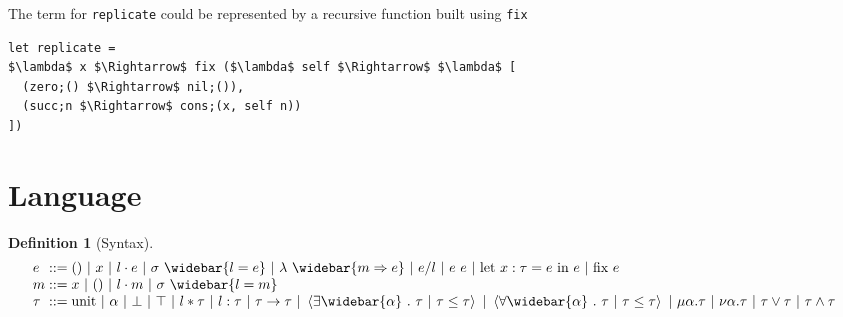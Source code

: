 \documentclass[manuscript]{acmart}
\theoremstyle{definition}
\newtheorem{definition}{Definition}[section]
\begin{document}
\noindent The term for \lstinline{replicate} could be represented by a recursive function built using \lstinline{fix} 

\begin{lstlisting}[]
let replicate = 
$\lambda$ x $\Rightarrow$ fix ($\lambda$ self $\Rightarrow$ $\lambda$ [
  (zero;() $\Rightarrow$ nil;()),
  (succ;n $\Rightarrow$ cons;(x, self n))
]) 
\end{lstlisting}


\section{Language}

\begin{definition}[Syntax]
\[
  \begin{array}{l @{} l}
    e 
    &{} ::=
    \begin{array}[t]{@{} l}
      () 
      \ |\ 
      x
      \ |\ 
      l \cdot e
      \ |\ 
      \sigma\ \widebar{l = e}
      \ |\ 
      \lambda\ \widebar{m \Rightarrow e} 
      \ |\ 
      e/l
      \ |\ 
      e\ e 
      \ |\ 
      \text{let } x : \tau = e\ \text{in}\ e
      \ |\ 
      \text{fix}\ e
    \end{array}
    \\
    m 
    &{} ::=
    \begin{array}[t]{@{} l}
      x 
      \ |\ 
      () 
      \ |\ 
      l \cdot m 
      \ |\ 
      \sigma\ \widebar{l = m}
    \end{array}
    \\
    \tau
    &{} ::=
    \begin{array}[t]{@{} l}
      \text{unit} 
      \ |\ 
      \alpha 
      \ |\ 
      \bot 
      \ |\ 
      \top 
      \ |\ 
      l*\tau 
      \ |\ 
      l:\tau 
      \ |\ 
      \tau\rightarrow\tau 
      \ |\ 
      \left<\exists \widebar{\alpha}\ .\ \tau\ |\ \tau \leq \tau\right>
      \ |\ 
      \left<\forall \widebar{\alpha}\ .\ \tau\ |\ \tau \leq \tau\right>
      \ |\ 
      \mu \alpha.\tau 
      \ |\ 
      \nu \alpha.\tau 
      \ |\ 
      \tau \vee \tau
      \ |\ 
      \tau \wedge \tau
    \end{array}
  \end{array}
\]

\end{definition}


  
\end{document}
